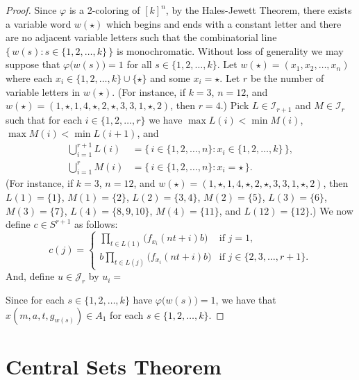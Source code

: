 \documentclass[12pt]{article}
\theoremstyle{plain}
\theoremstyle{definition}
\newcommand{\calI}{\mathcal{I}}
\newcommand{\calJ}{\mathcal{J}}
\begin{document}
\begin{proof}
  Since $\varphi$ is a 2-coloring of $[k]^n$, by the Hales-Jewett Theorem, there exists a variable word $w(\star)$ which begins and ends with a constant letter and there are no adjacent variable letters such that the combinatorial line $\bigl\{\, w(s) : s \in \{1, 2, \ldots, k\} \,\bigr\}$ is monochromatic. 
  Without loss of generality we may suppose that $\varphi\bigl( w(s) \bigr) = 1$ for all $s \in \{1, 2, \ldots, k\}$.
  Let $w(\star) = (x_1, x_2, \ldots, x_n)$ where each $x_i \in \{1, 2, \ldots, k\} \cup \{\star\}$ and some $x_i = \star$.
  Let $r$ be the number of variable letters in $w(\star)$.
  (For instance, if $k = 3$, $n = 12$, and $w(\star) = (1, \star, 1, 4, \star, 2, \star, 3, 3, 1, \star, 2)$, then $r = 4$.)
  Pick $L \in \calI_{r+1}$ and $M \in \calI_r$ such that for each $i \in \{1, 2, \ldots, r\}$ we have $\max L(i) < \min M(i)$, $\max M(i) < \min L(i+1)$, and 
  \begin{align*}
    \bigcup_{i=1}^{r+1} L(i) &= \bigl\{\, i \in \{1, 2, \ldots, n\} : x_i \in \{1, 2, \ldots, k\} \,\bigr\}, \\
    \bigcup_{i=1}^r M(i) &= \bigl\{\, i \in \{1, 2, \ldots, n\} : x_i = \star \,\}.
  \end{align*}
  (For instance, if $k = 3$, $n = 12$, and $w(\star) = (1, \star, 1, 4, \star, 2, \star, 3, 3, 1, \star, 2)$, then $L(1) = \{1\}$, $M(1) = \{2\}$, $L(2) = \{3, 4\}$, $M(2) = \{5\}$, $L(3) = \{6\}$, $M(3) = \{7\}$, $L(4) = \{8, 9, 10\}$, $M(4) = \{11\}$, and $L(12) = \{12\}$.)
  We now define $c \in S^{r+1}$ as follows:
  \[
    c(j) =
    \begin{cases}
      \prod_{t \in L(1)} \bigl( f_{x_i}(nt+i)b \bigr) & \mbox{if $j = 1$,} \\
      b\prod_{t \in L(j)} \bigl( f_{x_i}(nt+i)b \bigr) & \mbox{if $j \in \{2, 3, \ldots, r+1\}$.}
    \end{cases}
  \]
  And, define $u \in \calJ_r$ by $u_i = $
  
  Since for each $s \in \{1, 2, \ldots, k\}$ have $\varphi\bigl( w(s) \bigr) = 1$, we have that $x(m, a, t, g_{w(s)}) \in A_1$ for each $s \in \{1, 2, \ldots, k\}$.
\end{proof}


\section{Central Sets Theorem}




\end{document}
